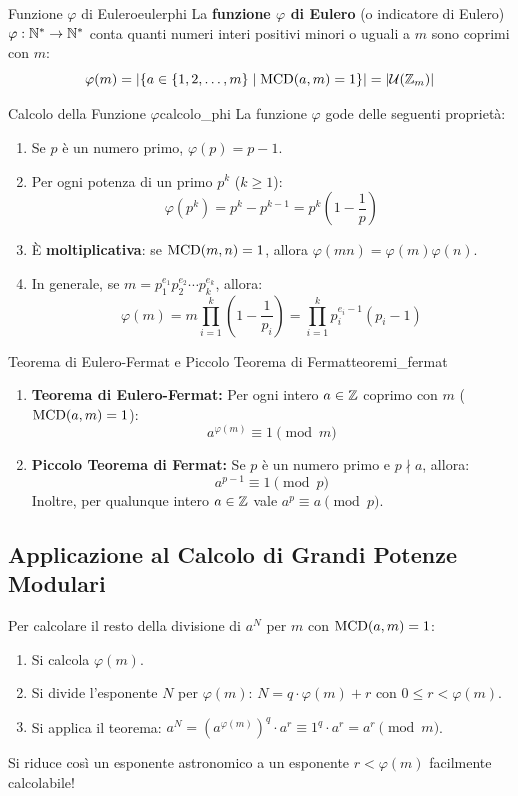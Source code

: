 \begin{definizione}{Funzione $\varphi$ di Eulero}{eulerphi}
La \textbf{funzione $\varphi$ di Eulero} (o indicatore di Eulero) $\varphi: \mathbb{N}^* \to \mathbb{N}^*$ conta quanti numeri interi positivi minori o uguali a $m$ sono coprimi con $m$:
\[
    \varphi(m) = |\{a \in \{1, 2, \dots, m\} \mid \operatorname{MCD}(a, m) = 1\}| = |\mathcal{U}(\mathbb{Z}_m)|
\]
\end{definizione}

\begin{teorema}{Calcolo della Funzione $\varphi$}{calcolo_phi}
La funzione $\varphi$ gode delle seguenti proprietà:
\begin{enumerate}
    \item Se $p$ è un numero primo, $\varphi(p) = p - 1$.
    \item Per ogni potenza di un primo $p^k$ ($k \ge 1$):
    \[
        \varphi(p^k) = p^k - p^{k-1} = p^k \left(1 - \frac{1}{p}\right)
    \]
    \item È \textbf{moltiplicativa}: se $\operatorname{MCD}(m, n) = 1$, allora $\varphi(mn) = \varphi(m)\varphi(n)$.
    \item In generale, se $m = p_1^{e_1} p_2^{e_2} \cdots p_k^{e_k}$, allora:
    \[
        \varphi(m) = m \prod_{i=1}^k \left(1 - \frac{1}{p_i}\right) = \prod_{i=1}^k p_i^{e_i - 1}(p_i - 1)
    \]
\end{enumerate}
\end{teorema}

\begin{teorema}{Teorema di Eulero-Fermat e Piccolo Teorema di Fermat}{teoremi_fermat}
\begin{enumerate}
    \item \textbf{Teorema di Eulero-Fermat:} Per ogni intero $a \in \mathbb{Z}$ coprimo con $m$ ($\operatorname{MCD}(a, m) = 1$):
    \[
        a^{\varphi(m)} \equiv 1 \pmod m
    \]
    \item \textbf{Piccolo Teorema di Fermat:} Se $p$ è un numero primo e $p \nmid a$, allora:
    \[
        a^{p-1} \equiv 1 \pmod p
    \]
    Inoltre, per qualunque intero $a \in \mathbb{Z}$ vale $a^p \equiv a \pmod p$.
\end{enumerate}
\end{teorema}

\subsection{Applicazione al Calcolo di Grandi Potenze Modulari}
Per calcolare il resto della divisione di $a^N$ per $m$ con $\operatorname{MCD}(a, m) = 1$:
\begin{enumerate}
    \item Si calcola $\varphi(m)$.
    \item Si divide l'esponente $N$ per $\varphi(m)$: $N = q \cdot \varphi(m) + r$ con $0 \le r < \varphi(m)$.
    \item Si applica il teorema: $a^N = (a^{\varphi(m)})^q \cdot a^r \equiv 1^q \cdot a^r = a^r \pmod m$.
\end{enumerate}
Si riduce così un esponente astronomico a un esponente $r < \varphi(m)$ facilmente calcolabile!
